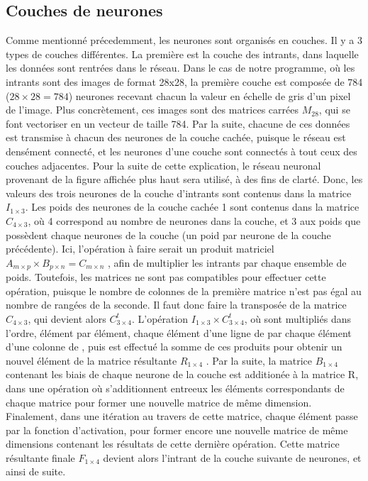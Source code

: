 \documentclass[letterpaper,10pt,french]{sphinxmanual}
\begin{document}
\subsection{Couches de neurones}
\label{\detokenize{notions_de_base:couches-de-neurones}}
Comme mentionné précedemment, les neurones sont organisés en couches. Il y a 3 types de couches différentes. La première est la couche des intrants, dans laquelle
les données sont rentrées dans le réseau. Dans le cas de notre programme, où les intrants sont des images de format 28x28,
la première couche est composée de 784 (\(28\times28 = 784\)) neurones recevant chacun la valeur en échelle de gris d’un pixel de l’image.
Plus concrètement, ces images sont des matrices carrées \(M_{28}\), qui se font vectoriser en un vecteur de taille 784. Par la suite, chacune de ces
données est transmise à chacun des neurones de la couche cachée, puisque le réseau est densément connecté, et les neurones d’une couche sont connectés à
tout ceux des couches adjacentes. Pour la suite de cette explication, le réseau neuronal provenant de la figure affichée plus haut sera utilisé, à des
fins de clarté. Donc, les valeurs des trois neurones de la couche d’intrants sont contenus dans la matrice \(I_{1\times3}\). Les poids des neurones de la couche cachée 1 sont
contenus dans la matrice \(C_{4\times3}\), où 4 correspond au nombre de neurones dans la couche, et 3 aux poids que possèdent chaque neurones de la couche (un poid par neurone
de la couche précédente). Ici, l’opération à faire serait un produit matriciel
\(A_{m\times p} \times B_{p\times n} = C_{m\times n}\)
, afin de multiplier les intrants par chaque ensemble de poids. Toutefois, les matrices ne sont
pas compatibles pour effectuer cette opération, puisque le nombre de colonnes de la première matrice n’est pas égal au nombre de rangées de la seconde.
Il faut donc faire la transposée de la matrice \(C_{4\times3}\), qui devient alors \(C_{3\times4}^{t}\). L’opération \(I_{1\times3} \times C_{3\times4}^{t}\), où sont multipliés
dans l’ordre, élément par élément, chaque élément d’une ligne de  par chaque élément d’une colonne de , puis est effectué la somme de
ces produits pour obtenir un nouvel élément de la matrice résultante \(R_{1\times4}\) . Par la suite, la matrice \(B_{1\times4}\)
contenant les biais de chaque neurone
de la couche est additionée à la matrice R, dans une opération où s’additionnent entre\sphinxhyphen{}eux les éléments correspondants de chaque matrice pour
former une nouvelle matrice de même dimension. Finalement, dans une itération au travers de cette matrice, chaque élément passe par la fonction d’activation,
pour former encore une nouvelle matrice de même dimensions contenant les résultats de cette dernière opération. Cette matrice résultante finale \(F_{1\times4}\) devient
alors l’intrant de la couche suivante de neurones, et ainsi de suite.
\end{document}
